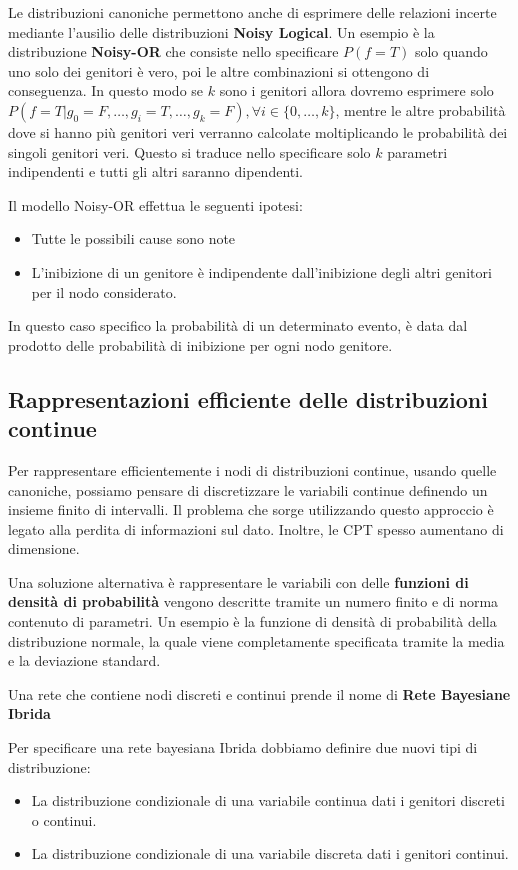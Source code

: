 Le distribuzioni canoniche permettono anche di esprimere delle relazioni incerte 
mediante l'ausilio delle distribuzioni \textbf{Noisy Logical}. Un esempio è la 
distribuzione \textbf{Noisy-OR} che consiste nello specificare $P(f = T)$ solo 
quando uno solo dei genitori è vero, poi le altre combinazioni si ottengono 
di conseguenza. In questo modo se $k$ sono i genitori allora dovremo esprimere 
solo $P(f=T | g_0 = F, \dots, g_i = T, \dots, g_k=F), \forall i \in \{0,\dots, k\}$,
mentre le altre probabilità dove si hanno più genitori veri verranno calcolate 
moltiplicando le probabilità dei singoli genitori veri. Questo si traduce nello specificare 
solo $k$ parametri indipendenti e tutti gli altri saranno dipendenti. 

Il modello Noisy-OR effettua le seguenti ipotesi:
\begin{itemize}
    \item Tutte le possibili cause sono note
    \item L'inibizione di un genitore è indipendente dall'inibizione degli altri
          genitori per il nodo considerato.
\end{itemize}
In questo caso specifico la probabilità di un determinato evento, è data dal
prodotto delle probabilità di inibizione per ogni nodo genitore.

\subsection{Rappresentazioni efficiente delle distribuzioni continue}
Per rappresentare efficientemente i nodi di distribuzioni continue, usando quelle
canoniche, possiamo pensare di discretizzare le variabili continue definendo un
insieme finito di intervalli. Il problema che sorge utilizzando questo approccio
è legato alla perdita di informazioni sul dato. Inoltre, le CPT spesso aumentano
di dimensione.

Una soluzione alternativa è rappresentare le variabili con delle \textbf{funzioni
    di densità di probabilità} vengono descritte tramite un numero finito e di
norma contenuto di parametri. Un esempio è la funzione di densità di probabilità
della distribuzione normale, la quale viene completamente specificata tramite
la media e la deviazione standard.
\begin{definizione}
    Una rete che contiene nodi discreti e continui prende il nome di \textbf{Rete
        Bayesiane Ibrida}
\end{definizione}
Per specificare una rete bayesiana Ibrida dobbiamo definire due nuovi tipi di
distribuzione:
\begin{itemize}
    \item La distribuzione condizionale di una variabile continua dati i genitori
          discreti o continui.
    \item La distribuzione condizionale di una variabile discreta dati i genitori
          continui.
\end{itemize}
